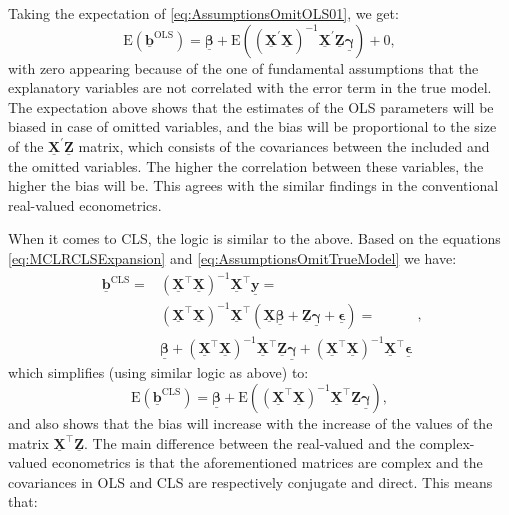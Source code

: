\documentclass[
]{book}
\begin{document}
Taking the expectation of \eqref{eq:AssumptionsOmitOLS01}, we get:
\begin{equation}
    \mathrm{E}\left(\underline{\boldsymbol{b}}^{\text{OLS}}\right) = \underline{\boldsymbol{\beta}} + \mathrm{E}\left(\left( \underline{\mathbf{X}}^\prime \underline{\mathbf{X}} \right)^{-1} \underline{\mathbf{X}}^\prime \underline{\mathbf{Z}} \underline{\boldsymbol{\gamma}} \right) + 0 ,
    \label{eq:AssumptionsOmitOLS02}
\end{equation}
with zero appearing because of the one of fundamental assumptions that the explanatory variables are not correlated with the error term in the true model. The expectation above shows that the estimates of the OLS parameters will be biased in case of omitted variables, and the bias will be proportional to the size of the \(\underline{\mathbf{X}}^\prime \underline{\mathbf{Z}}\) matrix, which consists of the covariances between the included and the omitted variables. The higher the correlation between these variables, the higher the bias will be. This agrees with the similar findings in the conventional real-valued econometrics.

When it comes to CLS, the logic is similar to the above. Based on the equations \eqref{eq:MCLRCLSExpansion} and \eqref{eq:AssumptionsOmitTrueModel} we have:
\begin{equation}
    \begin{aligned}
    \underline{\boldsymbol{b}}^{\text{CLS}} =
    & \left( \underline{\mathbf{X}}^\top \underline{\mathbf{X}}\right)^{-1} \underline{\mathbf{X}}^\top \underline{\mathbf{y}} = \\
    & \left( \underline{\mathbf{X}}^\top \underline{\mathbf{X}}\right)^{-1} \underline{\mathbf{X}}^\top \left(\underline{\mathbf{X}} \underline{\boldsymbol{\beta}} + \underline{\mathbf{Z}} \underline{\boldsymbol{\gamma}} + \underline{\boldsymbol{\epsilon}}\right) = \\
    & \underline{\boldsymbol{\beta}} + \left( \underline{\mathbf{X}}^\top \underline{\mathbf{X}}\right)^{-1} \underline{\mathbf{X}}^\top \underline{\mathbf{Z}} \underline{\boldsymbol{\gamma}} + \left( \underline{\mathbf{X}}^\top \underline{\mathbf{X}}\right)^{-1} \underline{\mathbf{X}}^\top \underline{\boldsymbol{\epsilon}}
    \end{aligned} ,
    \label{eq:AssumptionsOmitCLS01}
\end{equation}
which simplifies (using similar logic as above) to:
\begin{equation}
    \mathrm{E}\left(\underline{\boldsymbol{b}}^{\text{CLS}}\right) = \underline{\boldsymbol{\beta}} + \mathrm{E}\left( \left( \underline{\mathbf{X}}^\top \underline{\mathbf{X}}\right)^{-1} \underline{\mathbf{X}}^\top \underline{\mathbf{Z}} \underline{\boldsymbol{\gamma}}\right) ,
    \label{eq:AssumptionsOmitCLS02}
\end{equation}
and also shows that the bias will increase with the increase of the values of the matrix \(\underline{\mathbf{X}}^\top \underline{\mathbf{Z}}\). The main difference between the real-valued and the complex-valued econometrics is that the aforementioned matrices are complex and the covariances in OLS and CLS are respectively conjugate and direct. This means that:
\end{document}
